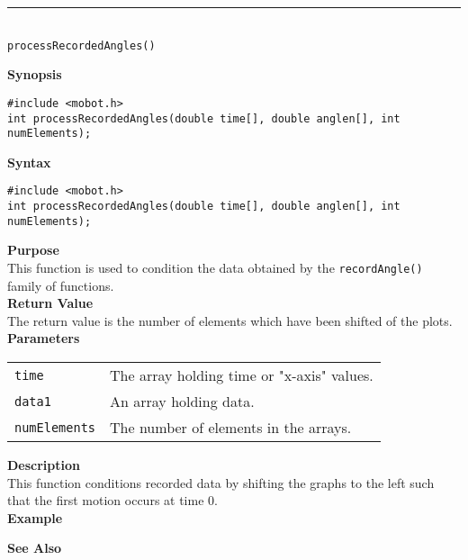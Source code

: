 \noindent
\vspace{5pt}
\rule{4.5in}{0.015in}\\
\noindent
{\LARGE \texttt{processRecordedAngles()}}\\
{}

\noindent
{\bf Synopsis}
\vspace{-8pt}
\begin{verbatim}
#include <mobot.h>
int processRecordedAngles(double time[], double anglen[], int numElements);
\end{verbatim}

\noindent
{\bf Syntax}
\vspace{-8pt}
\begin{verbatim}
#include <mobot.h>
int processRecordedAngles(double time[], double anglen[], int numElements);
\end{verbatim}

\noindent
{\bf Purpose}\\
This function is used to condition the data obtained by the \texttt{recordAngle()} family 
of functions. \\

\noindent
{\bf Return Value}\\
The return value is the number of elements which have been shifted of the plots. \\

\noindent
{\bf Parameters}
\vspace{-0.1in}
\begin{description}
\item               
\begin{tabular}{p{25 mm}p{145 mm}}
\texttt{time} & The array holding time or "x-axis" values. \\
\texttt{data1} & An array holding data. \\
\texttt{numElements} & The number of elements in the arrays. \\
\end{tabular}
\end{description}

\noindent
{\bf Description}\\
This function conditions recorded data by shifting the graphs to the left
such that the first motion occurs at time 0. \\

\noindent
{\bf Example}\\
\noindent

\noindent
{\bf See Also}\\

